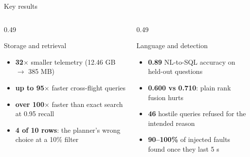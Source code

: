 \documentclass[aspectratio=169,10pt]{beamer}
\begin{document}
\begin{frame}[shrink=5]{Key results}
\begin{columns}[T]
\begin{column}{0.49\textwidth}
\begin{block}{Storage and retrieval}
\begin{itemize}
  \item \textbf{32$\times$} smaller telemetry (12.46 GB $\to$ 385 MB)
  \item \textbf{up to 95$\times$} faster cross-flight queries
  \item \textbf{over 100$\times$} faster than exact search at 0.95 recall
  \item \textbf{4 of 10 rows}: the planner's wrong choice at a 10\% filter
\end{itemize}
\end{block}
\end{column}
\begin{column}{0.49\textwidth}
\begin{block}{Language and detection}
\begin{itemize}
  \item \textbf{0.89} NL-to-SQL accuracy on held-out questions
  \item \textbf{0.600 vs 0.710}: plain rank fusion hurts
  \item \textbf{46} hostile queries refused for the intended reason
  \item \textbf{90--100\%} of injected faults found once they last 5 s
\end{itemize}
\end{block}
\end{column}
\end{columns}
\end{frame}
\end{document}
